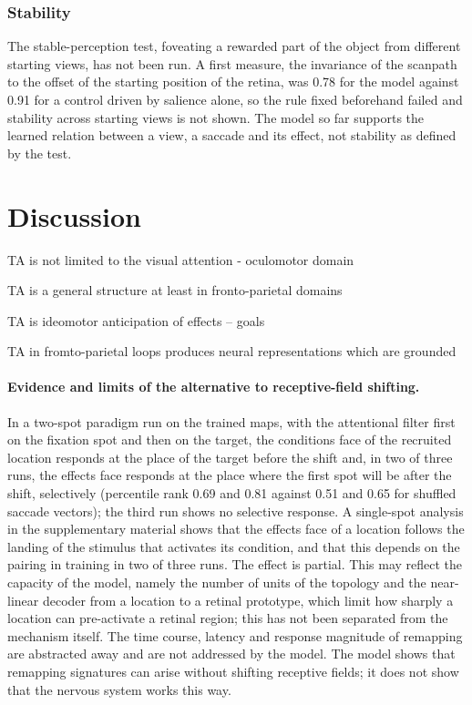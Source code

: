 \documentclass[14pt]{article}
\begin{document}
\subsubsection{Stability}

The stable-perception test, foveating a rewarded part of the object from different starting views, has not been run.
A first measure, the invariance of the scanpath to the offset of the starting position of the retina, was 0.78 for the model against 0.91 for a control driven by salience alone, so the rule fixed beforehand failed and stability across starting views is not shown.
The model so far supports the learned relation between a view, a saccade and its effect, not stability as defined by the test.

\section{Discussion}

TA is not limited to the visual attention - oculomotor domain

TA is a general structure at least in fronto-parietal domains

TA is ideomotor anticipation of effects -- goals

TA in fromto-parietal loops produces neural representations which are grounded

\paragraph{Evidence and limits of the alternative to receptive-field shifting.}
In a two-spot paradigm run on the trained maps, with the attentional filter first on the fixation spot and then on the target, the conditions face of the recruited location responds at the place of the target before the shift and, in two of three runs, the effects face responds at the place where the first spot will be after the shift, selectively (percentile rank 0.69 and 0.81 against 0.51 and 0.65 for shuffled saccade vectors); the third run shows no selective response.
A single-spot analysis in the supplementary material shows that the effects face of a location follows the landing of the stimulus that activates its condition, and that this depends on the pairing in training in two of three runs.
The effect is partial.
This may reflect the capacity of the model, namely the number of units of the topology and the near-linear decoder from a location to a retinal prototype, which limit how sharply a location can pre-activate a retinal region; this has not been separated from the mechanism itself.
The time course, latency and response magnitude of remapping are abstracted away and are not addressed by the model.
The model shows that remapping signatures can arise without shifting receptive fields; it does not show that the nervous system works this way.
\end{document}
